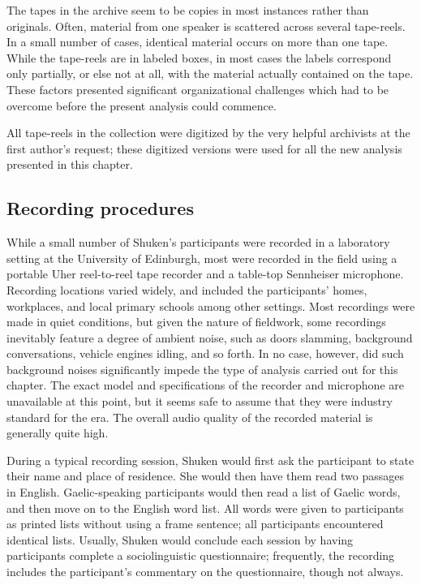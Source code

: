 \documentclass[output=paper,colorlinks,citecolor=brown]{langscibook}
\begin{document}
The tapes in the archive seem to be copies in most instances rather than originals. Often, material from one speaker is scattered across several tape-reels. In a small number of cases, identical material occurs on more than one tape. While the tape-reels are in labeled boxes, in most cases the labels correspond only partially, or else not at all, with the material actually contained on the tape. These factors presented significant organizational challenges which had to be overcome before the present analysis could commence.

All tape-reels in the collection were digitized by the very helpful archivists at the first author’s request; these digitized versions were used for all the new analysis presented in this chapter.

\subsection{Recording procedures}

While a small number of Shuken’s participants were recorded in a laboratory setting at the University of Edinburgh, most were recorded in the field using a portable Uher reel-to-reel tape recorder and a table-top Sennheiser microphone. Recording locations varied widely, and included the participants’ homes, workplaces, and local primary schools among other settings. Most recordings were made in quiet conditions, but given the nature of fieldwork, some recordings inevitably feature a degree of ambient noise, such as doors slamming, background conversations, vehicle engines idling, and so forth. In no case, however, did such background noises significantly impede the type of analysis carried out for this chapter. The exact model and specifications of the recorder and microphone are unavailable at this point, but it seems safe to assume that they were industry standard for the era. The overall audio quality of the recorded material is generally quite high.

During a typical recording session, Shuken would first ask the participant to state their name and place of residence. She would then have them read two passages in English. Gaelic-speaking participants would then read a list of Gaelic words, and then move on to the English word list. All words were given to participants as printed lists without using a frame sentence; all participants encountered identical lists. Usually, Shuken would conclude each session by having participants complete a sociolinguistic questionnaire; frequently, the recording includes the participant’s commentary on the questionnaire, though not always.
\end{document}
